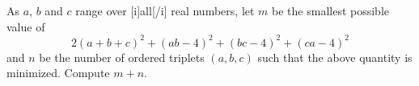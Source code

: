 As $a$, $b$ and $c$ range over [i]all[/i] real numbers, let $m$ be the smallest possible value of $$2\left(a+b+c\right)^2+\left(ab-4\right)^2+\left(bc-4\right)^2+\left(ca-4\right)^2$$ and $n$ be the number of ordered triplets $\left(a,b,c\right)$ such that the above quantity is minimized. Compute $m+n$.